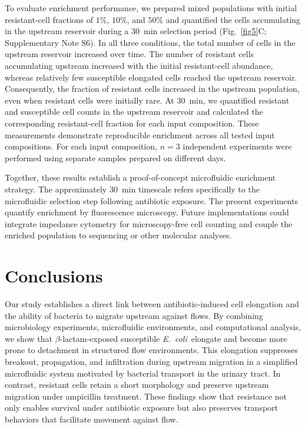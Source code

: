 \documentclass[twoside,twocolumn,9pt]{article}
\newcommand{\ecoli}{{\it E.~coli}}
\begin{document}
    To evaluate enrichment performance, we prepared mixed populations with initial resistant-cell fractions of $1\%$, $10\%$, and $50\%$ and quantified the cells accumulating in the upstream reservoir during a \SI{30}{\minute} selection period (Fig.~\ref{fig5}C; Supplementary Note S6). In all three conditions, the total number of cells in the upstream reservoir increased over time. The number of resistant cells accumulating upstream increased with the initial resistant-cell abundance, whereas relatively few susceptible elongated cells reached the upstream reservoir. Consequently, the fraction of resistant cells increased in the upstream population, even when resistant cells were initially rare. At \SI{30}{\minute}, we quantified resistant and susceptible cell counts in the upstream reservoir and calculated the corresponding resistant-cell fraction for each input composition. These measurements demonstrate reproducible enrichment across all tested input compositions. For each input composition, $n=3$ independent experiments were performed using separate samples prepared on different days.

    Together, these results establish a proof-of-concept microfluidic enrichment strategy. The approximately \SI{30}{\minute} timescale refers specifically to the microfluidic selection step following antibiotic exposure. The present experiments quantify enrichment by fluorescence microscopy. Future implementations could integrate impedance cytometry for microscopy-free cell counting and couple the enriched population to sequencing or other molecular analyses.

\section*{Conclusions}
    Our study establishes a direct link between antibiotic-induced cell elongation and the ability of bacteria to migrate upstream against flows. By combining microbiology experiments, microfluidic environments, and computational analysis, we show that $\beta$-lactam-exposed susceptible \ecoli\ elongate and become more prone to detachment in structured flow environments. This elongation suppresses breakout, propagation, and infiltration during upstream migration in a simplified microfluidic system motivated by bacterial transport in the urinary tract. In contrast, resistant cells retain a short morphology and preserve upstream migration under ampicillin treatment. These findings show that resistance not only enables survival under antibiotic exposure but also preserves transport behaviors that facilitate movement against flow.
    
\end{document}
